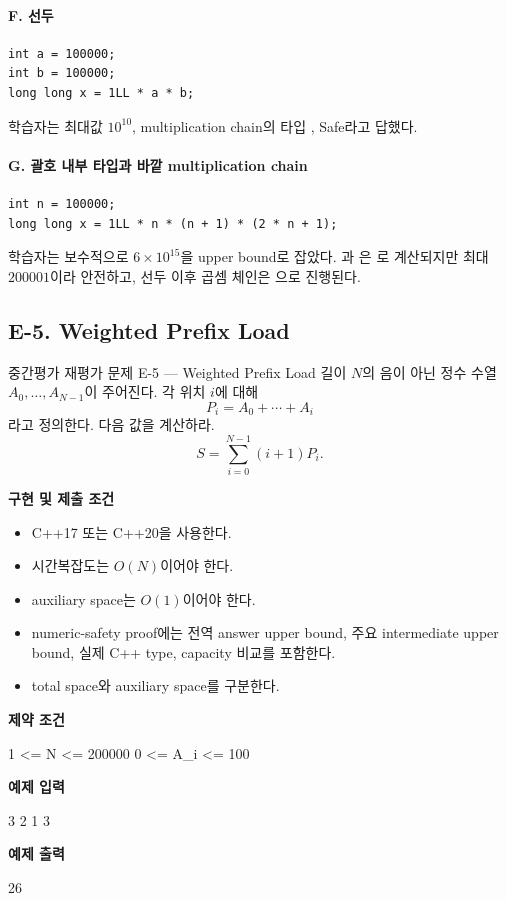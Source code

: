 \paragraph{F. 선두 }
\begin{lstlisting}
int a = 100000;
int b = 100000;
long long x = 1LL * a * b;
\end{lstlisting}
학습자는 최대값 $10^{10}$, multiplication chain의 타입 , Safe라고 답했다.

\paragraph{G. 괄호 내부 타입과 바깥 multiplication chain}
\begin{lstlisting}
int n = 100000;
long long x = 1LL * n * (n + 1) * (2 * n + 1);
\end{lstlisting}
학습자는 보수적으로 $6\times10^{15}$을 upper bound로 잡았다. 과 은 로 계산되지만 최대 $200001$이라 안전하고, 선두  이후 곱셈 체인은 으로 진행된다.

\subsection{E-5. Weighted Prefix Load}
\begin{problembox}{중간평가 재평가 문제 E-5 --- Weighted Prefix Load}
길이 $N$의 음이 아닌 정수 수열 $A_0,\dots,A_{N-1}$이 주어진다. 각 위치 $i$에 대해
\[
P_i=A_0+\cdots+A_i
\]
라고 정의한다. 다음 값을 계산하라.
\[
S=\sum_{i=0}^{N-1}(i+1)P_i.
\]

\textbf{구현 및 제출 조건}
\begin{itemize}
  \item C++17 또는 C++20을 사용한다.
  \item 시간복잡도는 $O(N)$이어야 한다.
  \item auxiliary space는 $O(1)$이어야 한다.
  \item numeric-safety proof에는 전역 answer upper bound, 주요 intermediate upper bound, 실제 C++ type, capacity 비교를 포함한다.
  \item total space와 auxiliary space를 구분한다.
\end{itemize}

\textbf{제약 조건}
\begin{TextBlock}
1 <= N <= 200000
0 <= A_i <= 100
\end{TextBlock}

\textbf{예제 입력}
\begin{TextBlock}
3
2 1 3
\end{TextBlock}

\textbf{예제 출력}
\begin{TextBlock}
26
\end{TextBlock}
\end{problembox}

